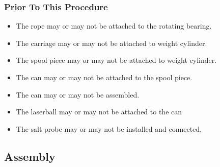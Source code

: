 \subsubsection{Prior To This Procedure}
  \begin{itemize}
  \item The rope may or may not be attached to the rotating bearing.
  \item The carriage may or may not be attached to weight cylinder.
  \item The spool piece may or may not be attached to weight cylinder.
  \item The can may or may not be attached to the spool piece.
  \item The can may or may not be assembled.
  \item The laserball may or may not be attached to the can
  \item The salt probe may or may not be installed and connected.
  \end{itemize}

\newpage

\subsection{Assembly}


